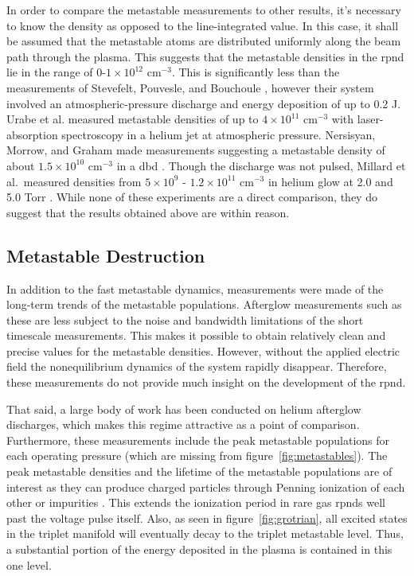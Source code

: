 In order to compare the metastable measurements to other results, it's necessary
to know the density as opposed to the line-integrated value. In this case, it
shall be assumed that the metastable atoms are distributed uniformly along the
beam path through the plasma. This suggests that the metastable densities in the
\acs{rpnd} lie in the range of 0-$1\times10^{12}$ cm$^{-3}$. This is
significantly less than the measurements of Stevefelt, Pouvesle, and Bouchoule
\cite{Pouvesle1988}, however their system involved an atmospheric-pressure
discharge and energy deposition of up to 0.2 J. Urabe et al. \cite{Urabe2010}
measured metastable densities of up to $4\times10^{11}$ cm$^{-3}$ with
laser-absorption spectroscopy in a helium jet at atmospheric pressure.
Nersisyan, Morrow, and Graham made measurements suggesting a metastable density
of about $1.5\times10^{10}$ cm$^{-3}$ in a \acs{dbd} \cite{Nersisyan2004}.
Though the discharge was not pulsed, Millard et al.\ measured densities from
$5\times10^9$ - $1.2\times10^{11}$ cm$^{-3}$ in helium glow at 2.0 and 5.0 Torr
\cite{Millard1998}. While none of these experiments are a direct comparison,
they do suggest that the results obtained above are within reason.

\subsection{Metastable Destruction}

In addition to the fast metastable dynamics, measurements were made of the
long-term trends of the metastable populations. Afterglow measurements such as
these are less subject to the noise and bandwidth limitations of the short
timescale measurements. This makes it possible to obtain relatively clean and
precise values for the metastable densities. However, without the applied
electric field the nonequilibrium dynamics of the system rapidly disappear.
Therefore, these measurements do not provide much insight on the development of
the \acs{rpnd}.

That said, a large body of work has been conducted on helium afterglow
discharges, which makes this regime attractive as a point of comparison.
Furthermore, these measurements include the peak metastable populations for each
operating pressure (which are missing from figure~\ref{fig:metastables}). The
peak metastable densities and the lifetime of the metastable populations are of
interest as they can produce charged particles through Penning ionization of
each other or impurities \cite{Nersisyan2004}. This extends the ionization
period in rare gas \acs{rpnd}s well past the voltage pulse itself. Also, as seen
in figure~\ref{fig:grotrian}, all excited states in the triplet manifold will
eventually decay to the triplet metastable level. Thus, a substantial portion of
the energy deposited in the plasma is contained in this one level.

